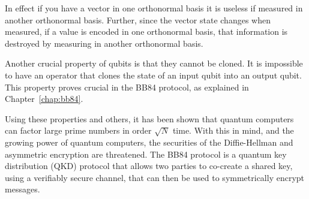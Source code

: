 In effect if you have a vector in one orthonormal basis it is useless if measured in another orthonormal basis.
Further, since the vector state changes when measured, if a value is encoded in one orthonormal basis, that information is destroyed by measuring in another orthonormal basis. 

Another crucial property of qubits is that they cannot be cloned.
It is impossible to have an operator that clones the state of an input qubit into an output qubit.
This property proves crucial in the BB84 protocol, as explained in Chapter~\ref{chap:bb84}.

Using these properties and others, it has been shown that quantum computers can factor large prime numbers in order $\sqrt{N}$ time.
With this in mind, and the growing power of quantum computers, the securities of the Diffie-Hellman and asymmetric encryption are threatened.
The BB84 protocol is a quantum key distribution (QKD) protocol that allows two parties to co-create a shared key, using a verifiably secure channel, that can then be used to symmetrically encrypt messages.